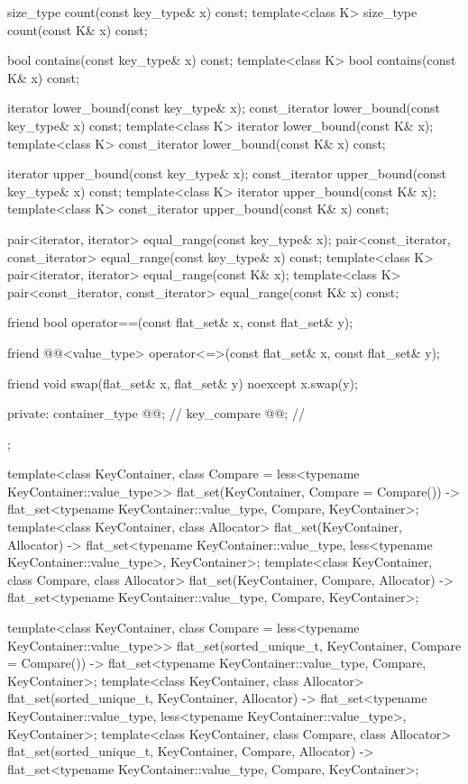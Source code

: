 \begin{codeblock}
{{    size_type count(const key_type& x) const;
    template<class K> size_type count(const K& x) const;

    bool contains(const key_type& x) const;
    template<class K> bool contains(const K& x) const;

    iterator lower_bound(const key_type& x);
    const_iterator lower_bound(const key_type& x) const;
    template<class K> iterator lower_bound(const K& x);
    template<class K> const_iterator lower_bound(const K& x) const;

    iterator upper_bound(const key_type& x);
    const_iterator upper_bound(const key_type& x) const;
    template<class K> iterator upper_bound(const K& x);
    template<class K> const_iterator upper_bound(const K& x) const;

    pair<iterator, iterator> equal_range(const key_type& x);
    pair<const_iterator, const_iterator> equal_range(const key_type& x) const;
    template<class K>
      pair<iterator, iterator> equal_range(const K& x);
    template<class K>
      pair<const_iterator, const_iterator> equal_range(const K& x) const;

    friend bool operator==(const flat_set& x, const flat_set& y);

    friend @@<value_type>
      operator<=>(const flat_set& x, const flat_set& y);

    friend void swap(flat_set& x, flat_set& y) noexcept { x.swap(y); }

  private:
    container_type @@;           // \expos
    key_compare @@;        // \expos
  };

  template<class KeyContainer, class Compare = less<typename KeyContainer::value_type>>
    flat_set(KeyContainer, Compare = Compare())
      -> flat_set<typename KeyContainer::value_type, Compare, KeyContainer>;
  template<class KeyContainer, class Allocator>
    flat_set(KeyContainer, Allocator)
      -> flat_set<typename KeyContainer::value_type,
                  less<typename KeyContainer::value_type>, KeyContainer>;
  template<class KeyContainer, class Compare, class Allocator>
    flat_set(KeyContainer, Compare, Allocator)
      -> flat_set<typename KeyContainer::value_type, Compare, KeyContainer>;

  template<class KeyContainer, class Compare = less<typename KeyContainer::value_type>>
    flat_set(sorted_unique_t, KeyContainer, Compare = Compare())
      -> flat_set<typename KeyContainer::value_type, Compare, KeyContainer>;
  template<class KeyContainer, class Allocator>
    flat_set(sorted_unique_t, KeyContainer, Allocator)
      -> flat_set<typename KeyContainer::value_type,
                  less<typename KeyContainer::value_type>, KeyContainer>;
  template<class KeyContainer, class Compare, class Allocator>
    flat_set(sorted_unique_t, KeyContainer, Compare, Allocator)
      -> flat_set<typename KeyContainer::value_type, Compare, KeyContainer>;

}
\end{codeblock}
